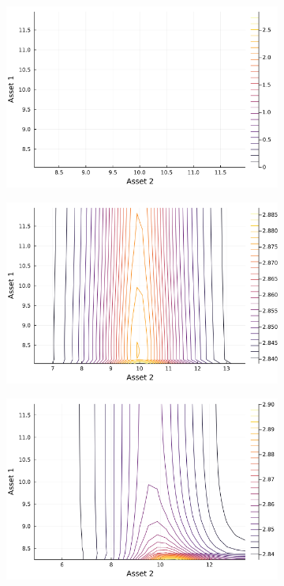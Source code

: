 \documentclass{article}
\begin{document}
\begin{figure}
    \centering
    \begin{subfigure}{0.4\textwidth}
        \includegraphics[width=\textwidth]{../plots/params/baseline/entropy_lower.png}
        \end{subfigure}
    \begin{subfigure}{0.4\textwidth}
        \includegraphics[width=\textwidth]{../plots/params/a2-mean-shift/entropy_lower.png}
    \end{subfigure}
    \begin{subfigure}{0.4\textwidth}
        \includegraphics[width=\textwidth]{../plots/params/a2-meanvar-shift/entropy_lower.png}

\end{subfigure}
\end{figure}
\end{document}
